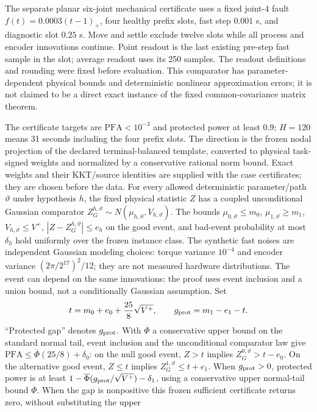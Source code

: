 \documentclass[journal]{IEEEtran}
\begin{document}
The separate planar six-joint mechanical certificate uses a fixed joint-4
fault $f(t)=0.0003(t-1)_+$, four healthy prefix slots, fast step $0.001$ s,
and diagnostic slot $0.25$ s. Move and settle exclude twelve slots while
all process and encoder innovations continue. Point readout is the last
existing pre-step fast sample in the slot; average readout uses its 250 samples.
The readout definitions and rounding were fixed before evaluation.
This comparator has parameter-dependent physical bounds and deterministic
nonlinear approximation errors; it is not claimed to be a direct exact
instance of the fixed common-covariance matrix theorem.


The certificate targets are $\mathrm{PFA}<10^{-3}$ and protected power
at least $0.9$; $H=120$ means 31 seconds including the four prefix slots.
The direction is the frozen nodal projection of the declared terminal-balanced
template, converted to physical task-signed weights and normalized by a
conservative rational norm bound. Exact weights and their KKT/source identities
are supplied with the case certificates; they are chosen before the data.
For every allowed deterministic parameter/path $\vartheta$ under hypothesis $h$,
the fixed physical statistic $Z$ has a coupled unconditional Gaussian comparator
$Z_G^{h,\vartheta}\sim N(\mu_{h,\vartheta},V_{h,\vartheta})$.
The bounds $\mu_{0,\vartheta}\le m_0$, $\mu_{1,\vartheta}\ge m_1$,
$V_{h,\vartheta}\le V^+$, $|Z-Z_G^{h,\vartheta}|\le e_h$ on the good event,
and bad-event probability at most $\delta_h$ hold uniformly over the frozen
instance class. The synthetic fast noises are independent Gaussian modeling
choices: torque variance $10^{-4}$ and encoder variance
$(2\pi/2^{17})^2/12$; they are not measured hardware distributions.
The event can depend on the same innovations: the proof uses event
inclusion and a union bound, not a conditionally Gaussian assumption.
Set
\[
t=m_0+e_0+\frac{25}{8}\sqrt{V^+},\qquad
g_{\rm prot}=m_1-e_1-t.
\]
``Protected gap'' denotes $g_{\rm prot}$. With $\overline\Phi$ a conservative upper bound on the standard normal tail,
event inclusion and the unconditional comparator law give
$\mathrm{PFA}\le\overline\Phi(25/8)+\delta_0$: on the null good event,
$Z>t$ implies $Z_G^{0,\vartheta}>t-e_0$.
On the alternative good event, $Z\le t$ implies
$Z_G^{1,\vartheta}\le t+e_1$. When $g_{\rm prot}>0$, protected power is at least
$1-\overline\Phi(g_{\rm prot}/\sqrt{V^+})-\delta_1$, using a conservative
upper normal-tail bound $\overline\Phi$. When the gap is nonpositive this
frozen sufficient certificate returns zero, without substituting the upper
\end{document}
